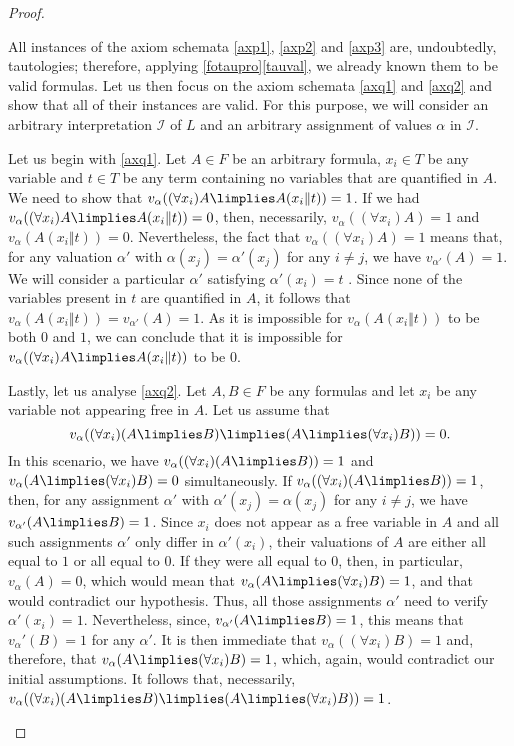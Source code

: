 \begin{proof}
\begin{parlist}
\item All instances of the axiom schemata \ref{axp1}, \ref{axp2} and \ref{axp3} are, undoubtedly, tautologies; therefore, applying \ref{fotaupro}\ref{tauval}, we already known them to be valid formulas.
Let us then focus on the axiom schemata \ref{axq1} and \ref{axq2} and show that all of their instances are valid.
For this purpose, we will consider an arbitrary interpretation $\mathcal{I}$ of $L$ and an arbitrary assignment of values $\alpha$ in $\mathcal{I}$.

Let us begin with \ref{axq1}. Let $A\in F$ be an arbitrary formula, $x_i\in T$ be any variable and $t\in T$ be any term containing no variables that are quantified in $A$.
We need to show that $v_\alpha( (\forall x_i) A \limplies A(x_i\Vert t)) = 1$.
If we had $v_\alpha( (\forall x_i) A \limplies A(x_i\Vert t)) = 0$, then, necessarily, $v_\alpha( (\forall x_i) A) = 1$ and $v_\alpha ( A(x_i\Vert t)) = 0$.
Nevertheless, the fact that $v_\alpha( (\forall x_i) A) = 1$ means that, for any valuation $\alpha'$ with $\alpha(x_j) = \alpha'(x_j)$ for any $i\neq j$, we have $v_{\alpha'}(A) = 1$.
We will consider a particular $\alpha'$ satisfying $\alpha'(x_i) = t$ .
Since none of the variables present in $t$ are quantified in $A$, it follows that $v_\alpha(A(x_i\Vert t)) = v_{\alpha'}(A) = 1$. As it is impossible for $v_\alpha(A(x_i\Vert t))$ to be both $0$ and $1$, we can conclude that it is impossible for $v_\alpha( (\forall x_i) A \limplies A(x_i\Vert t) )$ to be $0$.

Lastly, let us analyse \ref{axq2}. Let $A,B\in F$ be any formulas and let $x_i$ be any variable not appearing free in $A$. Let us assume that
\[v_\alpha( (\forall x_i)(A\limplies B) \limplies (A\limplies (\forall x_i) B)) = 0.\]
In this scenario, we have $v_\alpha( (\forall x_i) (A\limplies B) ) = 1$ and $v_\alpha(A\limplies (\forall x_i) B) = 0$ simultaneously. 
If $v_\alpha( (\forall x_i) (A\limplies B)) = 1$, then, for any assignment $\alpha'$ with $\alpha'(x_j) = \alpha(x_j)$ for any $i\neq j$, we have $v_{\alpha'}( A \limplies B) = 1$.
Since $x_i$ does not appear as a free variable in $A$ and all such assignments $\alpha'$ only differ in $\alpha'(x_i)$, their valuations of $A$ are either all equal to $1$ or all equal to $0$.
If they were all equal to $0$, then, in particular, $v_\alpha(A) = 0$, which would mean that $v_\alpha(A\limplies (\forall x_i) B) = 1$, and that would contradict our hypothesis.
Thus, all those assignments $\alpha'$ need to verify $\alpha'(x_i) = 1$.
Nevertheless, since, $v_{\alpha'}(A \limplies B) = 1$, this means that $v_\alpha'(B) = 1$ for any $\alpha'$.
It is then immediate that $v_\alpha( (\forall x_i) B) = 1$ and, therefore, that $v_\alpha( A\limplies (\forall x_i) B) = 1$, which, again, would contradict our initial assumptions.
It follows that, necessarily, $v_\alpha( (\forall x_i)(A\limplies B) \limplies (A\limplies (\forall x_i) B )) = 1$.


\end{parlist}
\end{proof}
